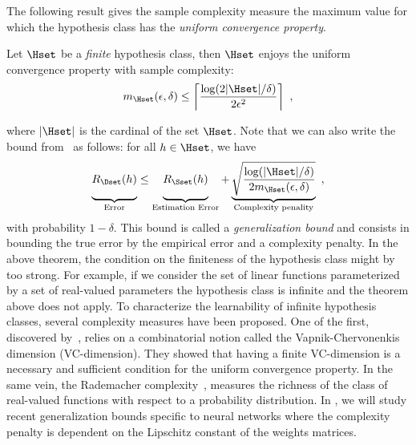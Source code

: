 The following result gives the sample complexity measure the maximum value for which the hypothesis class has the \emph{uniform convergence property}.
\begin{theorem} \label{theorem:ch2-sample_complexity_bound}
  Let $\Hset$ be a \emph{finite} hypothesis class, then $\Hset$ enjoys the uniform convergence property with sample complexity:
  \begin{equation}
    m_\Hset(\epsilon, \delta) \leq \left\lceil \frac{\log(2 |\Hset|	/ \delta)}{2 \epsilon^2} \right\rceil \enspace,
  \end{equation}
  \removespace
\end{theorem}
\noindent
where $|\Hset|$ is the cardinal of the set $\Hset$.
Note that we can also write the bound from~ as follows: for all $h \in \Hset$, we have
\begin{equation}
  \underbrace{\vphantom{\sqrt{\frac{\log(|\Hset|/\delta)}{2 m_\Hset(\epsilon, \delta)}}} R_\Dset(h)}_{\text{Error}} \leq \underbrace{\vphantom{\sqrt{\frac{\log(|\Hset|/\delta)}{2 m_\Hset(\epsilon, \delta)}}} R_\Sset(h)}_{\text{Estimation Error}} + \underbrace{\sqrt{\frac{\log(|\Hset|/\delta)}{2 m_\Hset(\epsilon, \delta)}}}_{\text{Complexity penality}} \enspace,
\end{equation}
with probability $1 - \delta$.
This bound is called a \emph{generalization bound} and consists in bounding the true error by the empirical error and a complexity penalty.
In the above theorem, the condition on the finiteness of the hypothesis class might by too strong.
For example, if we consider the set of linear functions parameterized by a set of real-valued parameters the hypothesis class is infinite and the theorem above does not apply.
To characterize the learnability of infinite hypothesis classes, several complexity measures have been proposed.
One of the first, discovered by~\citet{vapnik2015uniform}, relies on a combinatorial notion called the Vapnik-Chervonenkis dimension (VC-dimension). They showed that having a finite VC-dimension is a necessary and sufficient condition for the uniform convergence property.
In the same vein, the Rademacher complexity~\cite{koltchinskii2000rademacher}, measures the richness of the class of real-valued functions with respect to a probability distribution.
In , we will study recent generalization bounds specific to neural networks where the complexity penalty is dependent on the Lipschitz constant of the weights matrices.


